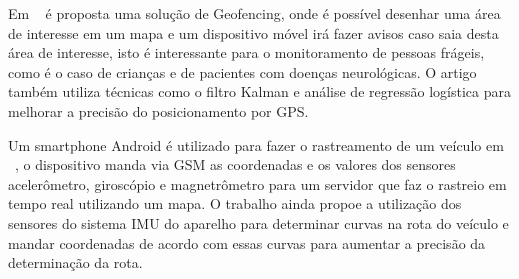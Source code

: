 Em ~\cite{tugrul2019} é proposta uma solução de Geofencing, onde é possível desenhar uma área de interesse em um mapa e um dispositivo móvel irá fazer avisos caso saia desta área de interesse, isto é interessante para o monitoramento de pessoas frágeis, como é o caso de crianças e de pacientes com doenças neurológicas. O artigo também utiliza técnicas como o filtro Kalman e análise de regressão logística para melhorar a precisão do posicionamento por GPS.

Um smartphone Android é utilizado para fazer o rastreamento de um veículo em ~\cite{verma2023}, o dispositivo manda via GSM as coordenadas e os valores dos sensores acelerômetro, giroscópio e magnetrômetro para um servidor que faz o rastreio em tempo real utilizando um mapa. O trabalho ainda propoe a utilização dos sensores do sistema IMU do aparelho para determinar curvas na rota do veículo e mandar coordenadas de acordo com essas curvas para aumentar a precisão da determinação da rota.


